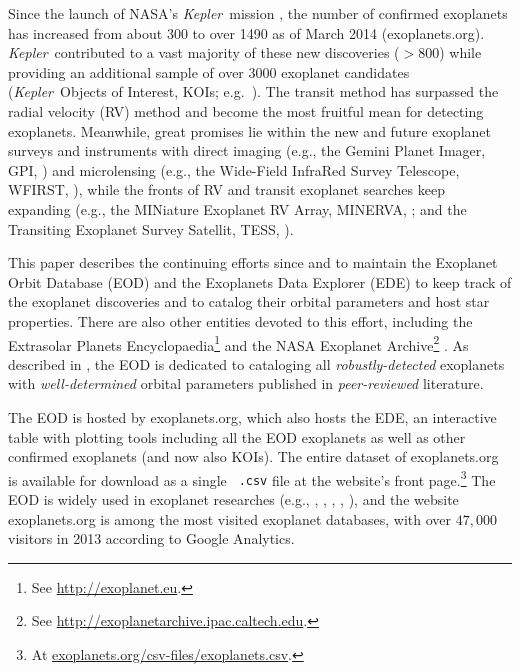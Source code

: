 \documentclass[11pt,preprint]{aastex}
\def\kepler{\textit{Kepler}}
\begin{document}
\begin{CJK*}{UTF8}{gbsn}
Since the launch of NASA's \kepler\ mission \citep{Borucki2010}, the
number of confirmed exoplanets has increased from about 300 to over
1490 as of March 2014 (exoplanets.org). \kepler\ contributed to a vast
majority of these new discoveries ($> 800$) while providing an
additional sample of over 3000 exoplanet candidates (\kepler\ Objects
of Interest, KOIs; e.g.~\citealt{Batalha2013}). The transit method has
surpassed the radial velocity (RV) method and become the most fruitful
mean for detecting exoplanets. Meanwhile, great promises lie within
the new and future exoplanet surveys and instruments with direct
imaging (e.g., the Gemini Planet Imager, GPI,
\citealt{Macintosh2014}) and microlensing (e.g., the Wide-Field
InfraRed Survey Telescope, WFIRST, \citealt{Green2012}), while the
fronts of RV and transit exoplanet searches keep expanding (e.g., the
MINiature Exoplanet RV Array, MINERVA, \citealt{Wright2014}; and the
Transiting Exoplanet Survey Satellit, TESS, \citealt{Ricker2010}).

This paper describes the continuing efforts since \cite{Butler2006}
and \cite{Wright2011} to maintain the Exoplanet Orbit Database (EOD)
and the Exoplanets Data Explorer (EDE) to keep track of the exoplanet
discoveries and to catalog their orbital parameters and host star
properties. There are also other entities devoted to this effort,
including the Extrasolar Planets Encyclopaedia\footnote{See
  \url{http://exoplanet.eu}.}  \citep{Schneider2011} and the NASA
Exoplanet Archive\footnote{See
  \url{http://exoplanetarchive.ipac.caltech.edu}.}
\citep{Akeson2013}. As described in \cite{Wright2011}, the EOD is
dedicated to cataloging all \emph{robustly-detected} exoplanets with
\emph{well-determined} orbital parameters published in
\emph{peer-reviewed} literature.

The EOD is hosted by exoplanets.org, which also hosts the EDE, an
interactive table with plotting tools including all the EOD exoplanets
as well as other confirmed exoplanets (and now also KOIs). The entire
dataset of exoplanets.org is available for download as a single {\tt
  .csv} file at the website's front page.\footnote{At
  \url{exoplanets.org/csv-files/exoplanets.csv}.} The EOD is widely
used in exoplanet researches (e.g., \citealt{Dawson2013},
\citealt{Howard2013}, \citealt{Kipping2013}, \citealt{Kane2014},
\citealt{Weiss2014}), and the website exoplanets.org is among the most
visited exoplanet databases, with over $47,000$ visitors in 2013
according to Google Analytics.


\end{CJK*}
\end{document}
